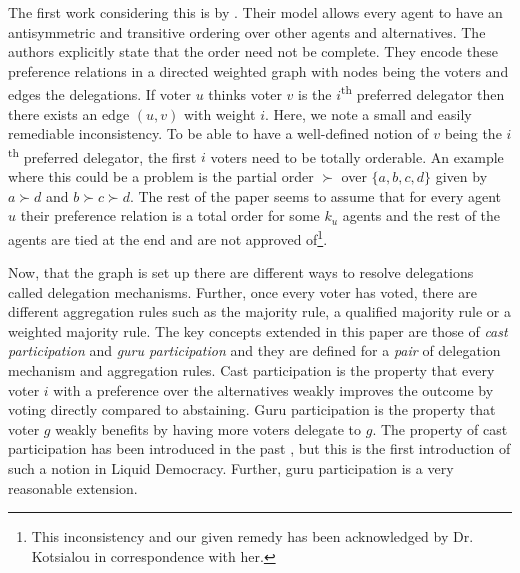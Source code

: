 \documentclass[11pt,a4paper, titlepage]{article}
\theoremstyle{definition}
\begin{document}
The first work considering this is by \citet{kotsialou}.
Their model allows every agent to have an antisymmetric and transitive ordering over other agents and alternatives.
The authors explicitly state that the order need not be complete.
They encode these preference relations in a directed weighted graph with nodes being the voters and edges the delegations.
If voter $u$ thinks voter $v$ is the $i$\textsuperscript{th} preferred delegator then there exists an edge $(u, v)$ with weight $i$.
Here, we note a small and easily remediable inconsistency. 
To be able to have a well-defined notion of $v$ being the $i$\textsuperscript{th} preferred delegator, the first $i$ voters need to be totally orderable.
An example where this could be a problem is the partial order $\succ$ over $\{a, b, c, d\}$ given by $a \succ d$ and $b \succ c \succ d$.
The rest of the paper seems to assume that for every agent $u$ their preference relation is a total order for some $k_u$ agents and the rest of the agents are tied at the end and are not approved of\footnote{This inconsistency and our given remedy has been acknowledged by Dr. Kotsialou in correspondence with her.}.

Now, that the graph is set up there are different ways to resolve delegations called delegation mechanisms. Further, once every voter has voted, there are different aggregation rules such as the majority rule, a qualified majority rule or a weighted majority rule.
The key concepts extended in this paper are those of \emph{cast participation} and \emph{guru participation} and they are defined for a \emph{pair} of delegation mechanism and aggregation rules.
Cast participation is the property that every voter $i$ with a preference over the alternatives weakly improves the outcome by voting directly compared to abstaining.
Guru participation is the property that voter $g$ weakly benefits by having more voters delegate to $g$.
The property of cast participation has been introduced in the past \citep{moulin1988condorcet}, but this is the first introduction of such a notion in Liquid Democracy. Further, guru participation is a very reasonable extension.
\end{document}
